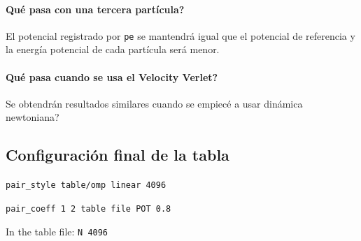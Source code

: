 \documentclass[../main.tex]{subfiles}
\begin{document}
\paragraph{Qué pasa con una tercera partícula?} El potencial registrado por \verb|pe| se mantendrá igual que el potencial de referencia y la energía potencial de cada partícula será menor.

\paragraph{Qué pasa cuando se usa el Velocity Verlet?} Se obtendrán resultados similares cuando se empiecé a usar dinámica newtoniana?

\subsection{Configuración final de la tabla}

\verb|pair_style table/omp linear 4096|

\verb|pair_coeff 1 2 table file POT 0.8|

In the table file: 
\verb|N 4096|
\end{document}

